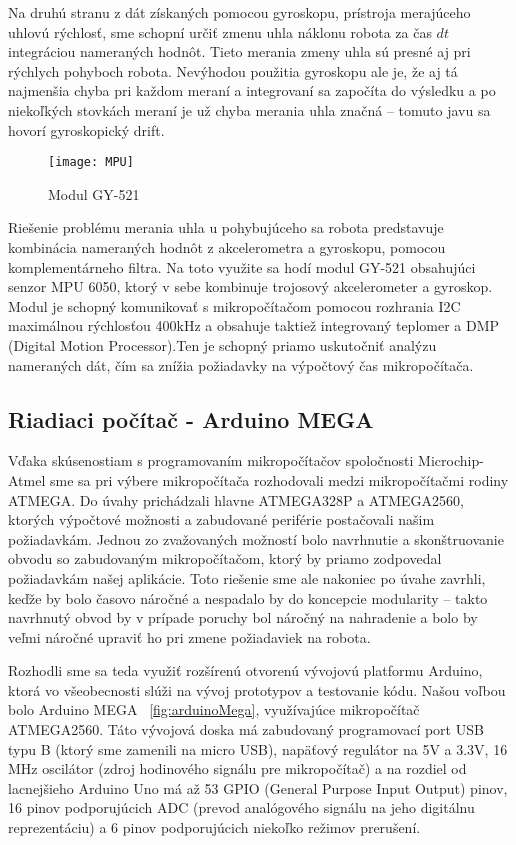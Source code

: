 Na druhú stranu z dát získaných pomocou gyroskopu, prístroja merajúceho uhlovú rýchlosť, sme schopní určiť zmenu uhla náklonu robota za čas $dt$ integráciou nameraných hodnôt. Tieto merania zmeny uhla sú presné aj pri rýchlych pohyboch robota. Nevýhodou použitia gyroskopu ale je, že aj tá najmenšia chyba pri každom meraní a integrovaní sa započíta do výsledku a po niekoľkých stovkách meraní je už chyba merania uhla značná – tomuto javu sa hovorí gyroskopický drift. 
\begin{figure}[h]
\centering
\texttt{[image: MPU]}
\caption{Modul GY-521\cite{GY-521pic}}
\label{fig:MPU}
\end{figure}
Riešenie problému merania uhla u pohybujúceho sa robota predstavuje kombinácia nameraných hodnôt z akcelerometra a gyroskopu, pomocou komplementárneho filtra. Na toto využite sa hodí modul GY-521 obsahujúci senzor MPU 6050\cite{MPU6050datasheet}, ktorý v sebe kombinuje trojosový akcelerometer a gyroskop. Modul je schopný komunikovať s mikropočítačom pomocou rozhrania I2C maximálnou rýchlosťou 400kHz a obsahuje taktiež integrovaný teplomer a DMP (Digital Motion Processor).Ten je schopný priamo uskutočniť analýzu nameraných dát, čím sa znížia požiadavky na výpočtový čas mikropočítača.



\subsection{Riadiaci počítač - Arduino MEGA}
Vďaka skúsenostiam s programovaním mikropočítačov spoločnosti Microchip-Atmel sme sa pri výbere mikropočítača rozhodovali medzi mikropočítačmi rodiny ATMEGA. Do úvahy prichádzali hlavne ATMEGA328P\cite{ATMEGA328} a ATMEGA2560\cite{ATMEGA2560}, ktorých výpočtové možnosti a zabudované periférie postačovali našim požiadavkám. Jednou zo zvažovaných možností bolo navrhnutie a skonštruovanie obvodu so zabudovaným mikropočítačom, ktorý by priamo zodpovedal požiadavkám našej aplikácie. Toto riešenie sme ale nakoniec po úvahe zavrhli, keďže by bolo časovo náročné a nespadalo by do koncepcie modularity – takto navrhnutý obvod by v prípade poruchy bol náročný na nahradenie a bolo by veľmi náročné upraviť ho pri zmene požiadaviek na robota.

Rozhodli sme sa teda využiť rozšírenú otvorenú vývojovú platformu Arduino, ktorá vo všeobecnosti slúži na vývoj prototypov a testovanie kódu. Našou voľbou bolo Arduino MEGA \figurename~\ref{fig:arduinoMega}, využívajúce mikropočítač ATMEGA2560. Táto vývojová doska má zabudovaný programovací port USB typu B (ktorý sme zamenili na micro USB), napäťový regulátor na 5V a 3.3V, 16 MHz oscilátor (zdroj hodinového signálu pre mikropočítač) a na rozdiel od lacnejšieho Arduino Uno má až 53 GPIO (General Purpose Input Output) pinov, 16 pinov podporujúcich ADC (prevod analógového signálu na jeho digitálnu reprezentáciu) a 6 pinov podporujúcich niekoľko režimov prerušení.

